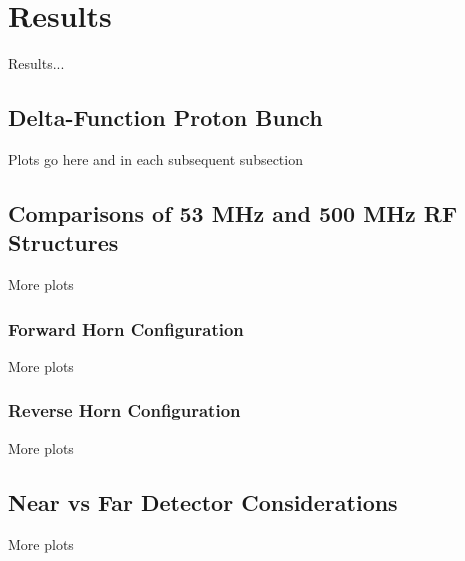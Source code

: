 %
%
\section{Results}
\label{results}
Results...
\subsection{Delta-Function Proton Bunch}
Plots go here and in each subsequent subsection
\subsection{Comparisons of 53 MHz and  500 MHz RF Structures}
More plots
\subsubsection{Forward Horn Configuration}
More plots
\subsubsection{Reverse Horn Configuration}
More plots



\subsection{Near vs Far Detector Considerations}
More plots

